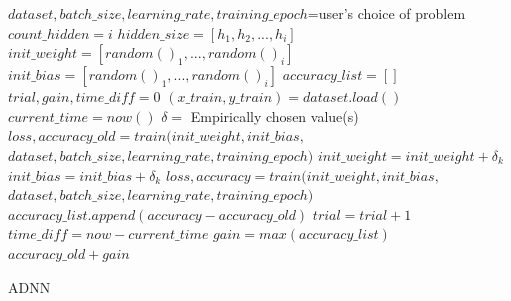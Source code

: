 \begin{algorithm}
	\footnotesize
	\begin{algorithmic}[1]
		\State $dataset,batch\_size, learning\_rate, training\_epoch$=user's choice of problem
		\State $count\_hidden=i$
		\State $hidden\_size=[h_1,h_2,...,h_i]$
		\State $init\_weight=[random()_1,...,random()_i]$
		\State $init\_bias=[random()_1,...,random()_i]$
		\State $accuracy\_list=[]$
		\State $trial,gain,time\_diff=0$
		\State	$(x\_train, y\_train)=dataset.load()$
		\State $current\_time=now()$
		\State $\delta=$ Empirically chosen value(s)
		\State $loss, accuracy\_old=train(init\_weight,init\_bias,$
					$dataset,batch\_size, learning\_rate, training\_epoch)$
		\State $init\_weight=init\_weight+\delta_k$
		\State $init\_bias=init\_bias+\delta_k$
		\State $loss, accuracy=train(init\_weight,init\_bias,$
		$dataset,batch\_size, learning\_rate, training\_epoch)$
		\State $accuracy\_list.append(accuracy-accuracy\_old)$
		\State $trial=trial+1$
		\State $time\_diff=now-current\_time$
		\State $gain=max(accuracy\_list)$
		\EndWhile
		\EndFor
		\State \Return $accuracy\_old+gain$
		\EndProcedure
	\end{algorithmic} 
	\caption{\footnotesize ADNN}
	\label{algo:adnn}
\end{algorithm}
